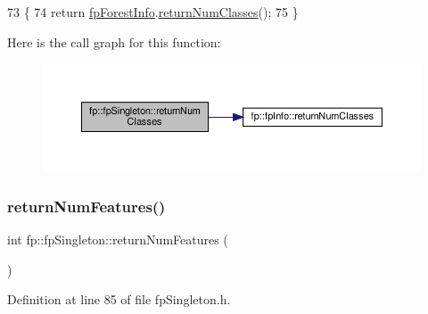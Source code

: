 \begin{DoxyCode}
73                                          \{
74                 \textcolor{keywordflow}{return} \hyperlink{classfp_1_1fpSingleton_a85965009befa72a749ae498fa5b6ccfa}{fpForestInfo}.\hyperlink{classfp_1_1fpInfo_a641516fa21a5d6170f74426cf9e2b255}{returnNumClasses}();
75             \}
\end{DoxyCode}
Here is the call graph for this function\+:\nopagebreak
\begin{figure}[H]
\begin{center}
\leavevmode
\includegraphics[width=350pt]{classfp_1_1fpSingleton_a5602580110329a6b25602b1789e4e2c2_cgraph}
\end{center}
\end{figure}
\mbox{\label{classfp_1_1fpSingleton_a97cbcad5ae9daa8c747fd4db84928c20}} 
\subsubsection{\texorpdfstring{return\+Num\+Features()}{returnNumFeatures()}}
{\footnotesize\ttfamily int fp\+::fp\+Singleton\+::return\+Num\+Features (\begin{DoxyParamCaption}{ }\end{DoxyParamCaption})\hspace{0.3cm}{\ttfamily [inline]}}



Definition at line 85 of file fp\+Singleton.\+h.


